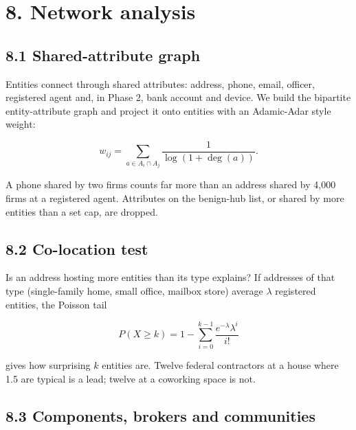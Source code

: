 \documentclass[letterpaper,11pt]{article}
\begin{document}
\hypertarget{network-analysis}{%
\section*{8. Network analysis}\label{network-analysis}}

\hypertarget{shared-attribute-graph}{%
\subsection*{8.1 Shared-attribute graph}\label{shared-attribute-graph}}

Entities connect through shared attributes: address, phone, email,
officer, registered agent and, in Phase 2, bank account and device. We
build the bipartite entity-attribute graph and project it onto entities
with an Adamic-Adar style weight:

\[w_{ij} = \sum_{a \in A_i \cap A_j} \frac{1}{\log(1 + \deg(a))}.\]

A phone shared by two firms counts far more than an address shared by
4,000 firms at a registered agent. Attributes on the benign-hub list, or
shared by more entities than a set cap, are dropped.

\hypertarget{co-location-test}{%
\subsection*{8.2 Co-location test}\label{co-location-test}}

Is an address hosting more entities than its type explains? If addresses
of that type (single-family home, small office, mailbox store) average
\(\lambda\) registered entities, the Poisson tail

\[P(X \ge k) = 1 - \sum_{i=0}^{k-1} \frac{e^{-\lambda}\lambda^i}{i!}\]

gives how surprising \(k\) entities are. Twelve federal contractors at a
house where 1.5 are typical is a lead; twelve at a coworking space is
not.

\hypertarget{components-brokers-and-communities}{%
\subsection*{8.3 Components, brokers and
communities}\label{components-brokers-and-communities}}
\end{document}
